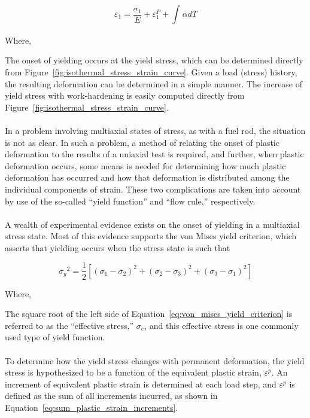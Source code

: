 \begin{equation}
    \label{eq:hooks_law}
    \varepsilon_{1} = \frac{\sigma_{1}}{E} + \varepsilon_{1}^{P} + \int_{}^{}\alpha dT
\end{equation}

Where,

The onset of yielding occurs at the yield stress, which can be determined directly from
Figure~\ref{fig:isothermal_stress_strain_curve}. Given a load (stress) history, the resulting
deformation can be determined in a simple manner. The increase of yield stress with work-hardening
is easily computed directly from Figure~\ref{fig:isothermal_stress_strain_curve}.
\\
\\
In a problem involving multiaxial states of stress, as with a fuel rod, the situation is not as
clear. In such a problem, a method of relating the onset of plastic deformation to the results of a
uniaxial test is required, and further, when plastic deformation occurs, some means is needed for
determining how much plastic deformation has occurred and how that deformation is distributed among
the individual components of strain. These two complications are taken into account by use of the
so-called ``yield function'' and ``flow rule,'' respectively.
\\
\\
A wealth of experimental evidence exists on the onset of yielding in a multiaxial stress state. Most
of this evidence supports the von Mises yield criterion, which asserts that yielding occurs when the
stress state is such that

\begin{equation}
    {\sigma_{y}}^{2} = \frac{1}{2}\left\lbrack \left( \sigma_{1} -
    \sigma_{2} \right)^{2} + \left( \sigma_{2} - \sigma_{3} \right)^{2} +
    \left( \sigma_{3} - \sigma_{1} \right)^{2} \right\rbrack
    \label{eq:von_mises_yield_criterion}
\end{equation}

Where,

The square root of the left side of Equation~\ref{eq:von_mises_yield_criterion} is referred to as
the ``effective stress,'' \(\sigma_{e}\), and this effective stress is one commonly used type of yield
function.
\\
\\
To determine how the yield stress changes with permanent deformation, the yield stress is
hypothesized to be a function of the equivalent plastic strain, \(\varepsilon^{p}\). An increment of
equivalent plastic strain is determined at each load step, and \(\varepsilon^{p}\) is defined as the
sum of all increments incurred, as shown in Equation~\ref{eq:sum_plastic_strain_increments}.

